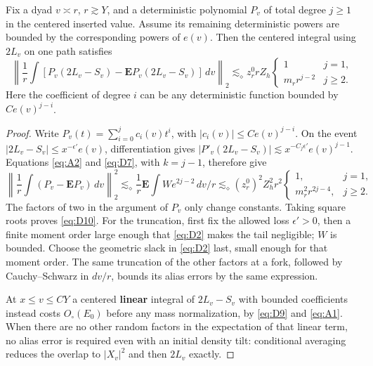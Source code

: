 \begin{lemma}\label{lem:statistics-centered}
Fix a dyad \(v\asymp r\), \(r\gtrsim Y\), and a deterministic polynomial \(P_v\) of total degree \(j\ge1\) in the centered inserted value. Assume its remaining deterministic powers are bounded by the corresponding powers of \(e(v)\). Then the centered integral using \(2L_v\) on one path satisfies
\begin{equation}
\left\|\frac1r\int [P_v(2L_v-S_v)-\mathbf EP_v(2L_v-S_v)]\,dv\right\|_2
 \lesssim_\diamond z_r^0 r Z_h
       \begin{cases}1& j=1,\\ m_r r^{j-2}& j\ge2.\end{cases}             \tag{D10}\label{eq:D10}
\end{equation}
Here the coefficient of degree \(i\) can be any deterministic function bounded by \(C e(v)^{j-i}\). \end{lemma}
\begin{proof}
Write $P_v(t)=\sum_{i=0}^j c_i(v)t^i$, with
$|c_i(v)|\le Ce(v)^{j-i}$.  On the event
$|2L_v-S_v|\le x^{-\epsilon'}e(v)$, differentiation gives
$|P'_v(2L_v-S_v)|\lesssim x^{-C_j\epsilon'}e(v)^{j-1}$.
Equations \eqref{eq:A2} and \eqref{eq:D7}, with $k=j-1$, therefore give
\[
 \left\|\frac1r\int(P_v-\mathbf EP_v)\,dv\right\|_2^2
 \lesssim_\diamond \frac1r\mathbf E\int W e^{2j-2}\,dv/r
 \lesssim_\diamond (z_r^0)^2Z_h^2r^2
 \begin{cases}1,&j=1,\\m_r^2r^{2j-4},&j\ge2.\end{cases}
\]
The factors of two in the argument of $P_v$ only change constants.
Taking square roots proves \eqref{eq:D10}.  For the truncation, first
fix the allowed loss $\epsilon'>0$, then a finite moment order large
enough that \eqref{eq:D2} makes the tail negligible; $W$ is bounded.
Choose the geometric slack in \eqref{eq:D2} last, small enough for that
moment order.  The same truncation of the other factors at a fork,
followed by Cauchy--Schwarz in $dv/r$, bounds its alias errors by the
same expression.

At \(x\le v\le C Y\) a centered \textbf{linear} integral of \(2L_v-S_v\) with bounded coefficients instead costs \(O_\circ(E_0)\) before any mass normalization, by \eqref{eq:D9} and \eqref{eq:A1}. When there are no other random factors in the expectation of that linear term, no alias error is required even with an initial density tilt: conditional averaging reduces the overlap to \(|X_v|^2\) and then \(2L_v\) exactly.

\end{proof}

